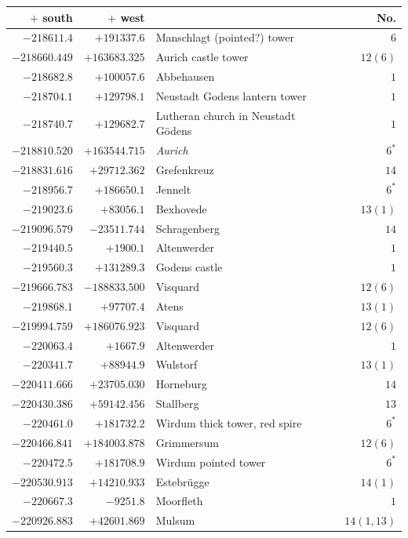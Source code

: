 \clearpage
\begin{center}\begingroup\fontsize{8}{9}\selectfont
\setlength{\tabcolsep}{4pt}
\begin{tabular}{r|r|p{170pt}|r}\hline
\(+\) south&\(+\) west&&No.\\\hline
\(-218611.4\)&\(+191337.6\)&Manschlagt (pointed?) tower&\(6\)\\
\(-218660.449\)&\(+163683.325\)&Aurich castle tower&\(12 (6)\)\\
\(-218682.8\)&\(+100057.6\)&Abbehausen&\(1\)\\
\(-218704.1\)&\(+129798.1\)&Neustadt Godens lantern tower&\(1\)\\
\(-218740.7\)&\(+129682.7\)&Lutheran church in Neustadt Gödens&\(1\)\\
\(-218810.520\)&\(+163544.715\)&\textit{Aurich}&\(6^{*}\)\\
\(-218831.616\)&\(+29712.362\)&Grefenkreuz&\(14\)\\
\(-218956.7\)&\(+186650.1\)&Jennelt&\(6^{*}\)\\
\(-219023.6\)&\(+83056.1\)&Bexhovede&\(13 (1)\)\\
\(-219096.579\)&\(-23511.744\)&Schragenberg&\(14\)\\
\(-219440.5\)&\(+1900.1\)&Altenwerder&\(1\)\\
\(-219560.3\)&\(+131289.3\)&Godens castle&\(1\)\\
\(-219666.783\)&\(-188833.500\)&Visquard&\(12 (6)\)\\
\(-219868.1\)&\(+97707.4\)&Atens&\(13 (1)\)\\
\(-219994.759\)&\(+186076.923\)&Visquard&\(12 (6)\)\\
\(-220063.4\)&\(+1667.9\)&Altenwerder&\(1\)\\
\(-220341.7\)&\(+88944.9\)&Wulstorf&\(13 (1)\)\\
\(-220411.666\)&\(+23705.030\)&Horneburg&\(14\)\\
\(-220430.386\)&\(+59142.456\)&Stallberg&\(13\)\\
\(-220461.0\)&\(+181732.2\)&Wirdum thick tower, red spire&\(6^{*}\)\\
\(-220466.841\)&\(+184003.878\)&Grimmersum&\(12 (6)\)\\
\(-220472.5\)&\(+181708.9\)&Wirdum pointed tower&\(6^{*}\)\\
\(-220530.913\)&\(+14210.933\)&Estebrügge&\(14 (1)\)\\
\(-220667.3\)&\(-9251.8\)&Moorfleth&\(1\)\\
\(-220926.883\)&\(+42601.869\)&Mulsum&\(14(1,13)\)\\

\end{tabular}
\end{center}
